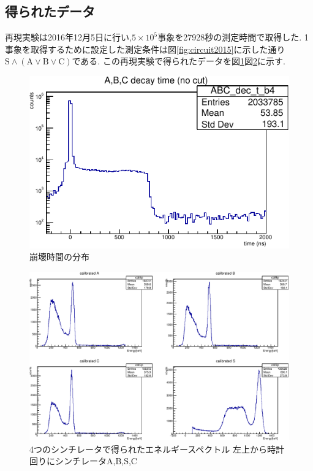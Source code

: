 \subsection{得られたデータ}
再現実験は2016年12月5日に行い,$5\times 10^{5}$事象を27928秒の測定時間で取得した.
1事象を取得するために設定した測定条件は図\ref{fig:circuit2015}に示した通り$\textrm{S}\land(\textrm{A}\lor \textrm{B}\lor \textrm{C})$である.
この再現実験で得られたデータを図\ref{fig:dec_t_b4}図\ref{fig:calibrated9075}に示す.
\begin{figure}[H]
	\centering
		\includegraphics[width=12cm]{fig/isb/decay_t.pdf}
		\caption{崩壊時間の分布}
		\label{fig:dec_t_b4}
\end{figure}

\begin{figure}[H]
	\centering
	\includegraphics[width=15cm]{fig/isb/cal_9075.pdf}
	\caption{4つのシンチレータで得られたエネルギースペクトル \newline 左上から時計回りにシンチレータA,B,S,C}
	\label{fig:calibrated9075}
\end{figure}

